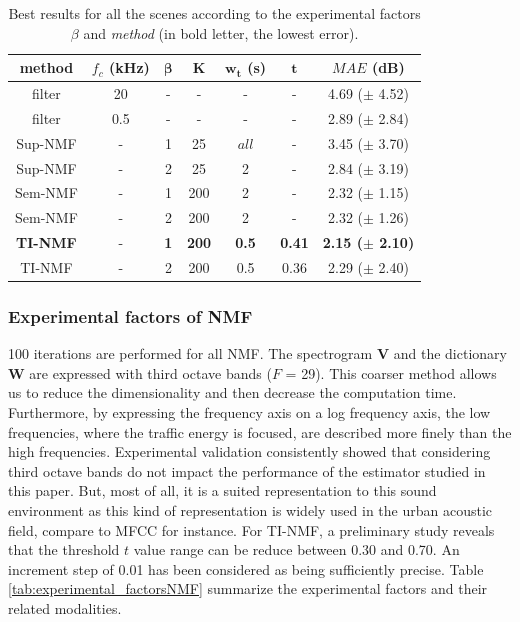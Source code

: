 \documentclass[twocolumn]{svjour3}          %
\begin{document}
\begin{table}[t]
\centering
\caption{Best results for all the scenes according to the experimental factors $\beta$ and \textit{method} (in bold letter, the lowest error).}
\begin{tabular}{@{}ccccccc@{}}
\toprule
\textbf{method} & $f_c$ (kHz) & $\mathbf{\beta}$ & $\mathbf{K}$ & $\mathbf{w_t}$ (s) &   $\mathbf{t}$ & \textbf{$MAE$} (dB) \\ \midrule
filter & 20  & - & - & - & - & 4.69 ($\pm$ 4.52) \\
filter & 0.5 & - &-  & - & - & 2.89 ($\pm$ 2.84) \\ \hline \hline
Sup-NMF & - & 1 & 25 & $all$  & - & 3.45 ($\pm$ 3.70) \\
Sup-NMF & - & 2 & 25 & 2  & - & 2.84 ($\pm$ 3.19) \\ \hline \hline
Sem-NMF & - & 1 & 200 & 2 & -  & 2.32 ($\pm$ 1.15) \\
Sem-NMF & - & 2 & 200 & 2 & -  & 2.32 ($\pm$ 1.26) \\ \hline \hline
\textbf{TI-NMF} & - & \textbf{1} & \textbf{200} & \textbf{0.5} &  \textbf{0.41} &\textbf{2.15 ($\pm$ 2.10)} \\
TI-NMF & - & 2 & 200 & 0.5 &  0.36 & 2.29 ($\pm$ 2.40)\\ \bottomrule
\end{tabular}
\label{tab:results}
\end{table}


\subsubsection{Experimental factors of NMF}

100 iterations are performed for all NMF. The spectrogram $\mathbf{V}$ and the dictionary $\mathbf{W}$ are expressed with third octave bands ($F$ = 29). This coarser method allows us to reduce the dimensionality and then decrease the computation time. Furthermore, by expressing the frequency axis on a log frequency axis, the low frequencies, where the traffic energy is focused, are described more finely than the high frequencies. Experimental validation consistently showed that considering third octave bands do not impact the performance of the estimator studied in this paper. But, most of all, it is a suited representation to this sound environment as this kind of representation is widely used in the urban acoustic field, compare to MFCC for instance. For TI-NMF, a preliminary study reveals that the threshold $t$ value range can be reduce between  0.30 and 0.70. An increment step of 0.01 has been considered as being sufficiently precise. Table \ref{tab:experimental_factorsNMF} summarize the experimental factors and their related modalities.
\end{document}
